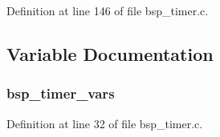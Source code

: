 Definition at line 146 of file bsp\+\_\+timer.\+c.



\subsection{Variable Documentation}
\subsubsection[{\texorpdfstring{bsp\+\_\+timer\+\_\+vars}{bsp_timer_vars}}]{ bsp\+\_\+timer\+\_\+vars}\hypertarget{_open_mote-_c_c2538_2bsp__timer_8c_a2c30c3f080deb67f34bab3e451c4aba9}{}\label{_open_mote-_c_c2538_2bsp__timer_8c_a2c30c3f080deb67f34bab3e451c4aba9}


Definition at line 32 of file bsp\+\_\+timer.\+c.


